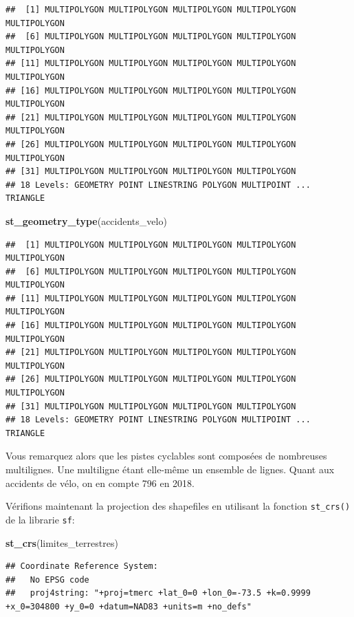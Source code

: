 \documentclass[]{article}
\newenvironment{Shaded}{\begin{snugshade}}{\end{snugshade}}
\newcommand{\KeywordTok}[1]{\textcolor[rgb]{0.13,0.29,0.53}{\textbf{#1}}}
\newcommand{\NormalTok}[1]{#1}
\begin{document}
\begin{verbatim}
##  [1] MULTIPOLYGON MULTIPOLYGON MULTIPOLYGON MULTIPOLYGON MULTIPOLYGON
##  [6] MULTIPOLYGON MULTIPOLYGON MULTIPOLYGON MULTIPOLYGON MULTIPOLYGON
## [11] MULTIPOLYGON MULTIPOLYGON MULTIPOLYGON MULTIPOLYGON MULTIPOLYGON
## [16] MULTIPOLYGON MULTIPOLYGON MULTIPOLYGON MULTIPOLYGON MULTIPOLYGON
## [21] MULTIPOLYGON MULTIPOLYGON MULTIPOLYGON MULTIPOLYGON MULTIPOLYGON
## [26] MULTIPOLYGON MULTIPOLYGON MULTIPOLYGON MULTIPOLYGON MULTIPOLYGON
## [31] MULTIPOLYGON MULTIPOLYGON MULTIPOLYGON MULTIPOLYGON
## 18 Levels: GEOMETRY POINT LINESTRING POLYGON MULTIPOINT ... TRIANGLE
\end{verbatim}

\begin{Shaded}
\begin{Highlighting}[]
\KeywordTok{st_geometry_type}\NormalTok{(accidents_velo)}
\end{Highlighting}
\end{Shaded}

\begin{verbatim}
##  [1] MULTIPOLYGON MULTIPOLYGON MULTIPOLYGON MULTIPOLYGON MULTIPOLYGON
##  [6] MULTIPOLYGON MULTIPOLYGON MULTIPOLYGON MULTIPOLYGON MULTIPOLYGON
## [11] MULTIPOLYGON MULTIPOLYGON MULTIPOLYGON MULTIPOLYGON MULTIPOLYGON
## [16] MULTIPOLYGON MULTIPOLYGON MULTIPOLYGON MULTIPOLYGON MULTIPOLYGON
## [21] MULTIPOLYGON MULTIPOLYGON MULTIPOLYGON MULTIPOLYGON MULTIPOLYGON
## [26] MULTIPOLYGON MULTIPOLYGON MULTIPOLYGON MULTIPOLYGON MULTIPOLYGON
## [31] MULTIPOLYGON MULTIPOLYGON MULTIPOLYGON MULTIPOLYGON
## 18 Levels: GEOMETRY POINT LINESTRING POLYGON MULTIPOINT ... TRIANGLE
\end{verbatim}

Vous remarquez alors que les pistes cyclables sont composées de
nombreuses multilignes. Une multiligne étant elle-même un ensemble de
lignes. Quant aux accidents de vélo, on en compte 796 en 2018.

Vérifions maintenant la projection des shapefiles en utilisant la
fonction \texttt{st\_crs()} de la librarie \texttt{sf}:

\begin{Shaded}
\begin{Highlighting}[]
\KeywordTok{st_crs}\NormalTok{(limites_terrestres)}
\end{Highlighting}
\end{Shaded}

\begin{verbatim}
## Coordinate Reference System:
##   No EPSG code
##   proj4string: "+proj=tmerc +lat_0=0 +lon_0=-73.5 +k=0.9999 +x_0=304800 +y_0=0 +datum=NAD83 +units=m +no_defs"
\end{verbatim}
\end{document}
